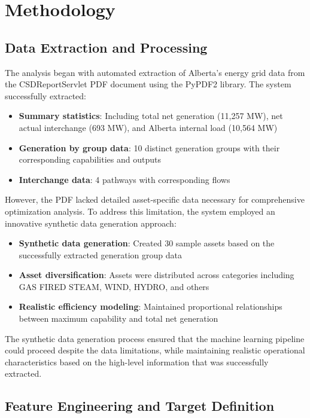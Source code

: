 \documentclass[12pt,a4paper]{article}
\begin{document}
\section{Methodology}
\subsection{Data Extraction and Processing}

The analysis began with automated extraction of Alberta's energy grid data from the CSDReportServlet PDF document using the PyPDF2 library. The system successfully extracted:

\begin{itemize}
    \item \textbf{Summary statistics}: Including total net generation (11,257 MW), net actual interchange (693 MW), and Alberta internal load (10,564 MW)
    \item \textbf{Generation by group data}: 10 distinct generation groups with their corresponding capabilities and outputs
    \item \textbf{Interchange data}: 4 pathways with corresponding flows
\end{itemize}

However, the PDF lacked detailed asset-specific data necessary for comprehensive optimization analysis. To address this limitation, the system employed an innovative synthetic data generation approach:

\begin{itemize}
    \item \textbf{Synthetic data generation}: Created 30 sample assets based on the successfully extracted generation group data
    \item \textbf{Asset diversification}: Assets were distributed across categories including GAS FIRED STEAM, WIND, HYDRO, and others
    \item \textbf{Realistic efficiency modeling}: Maintained proportional relationships between maximum capability and total net generation
\end{itemize}

The synthetic data generation process ensured that the machine learning pipeline could proceed despite the data limitations, while maintaining realistic operational characteristics based on the high-level information that was successfully extracted.

\subsection{Feature Engineering and Target Definition}
\end{document}
